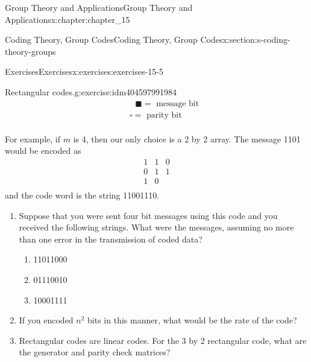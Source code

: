 \documentclass[twoside,10pt,]{book}
\numberwithin{equation}{section}
\begin{document}
\begin{chapterptx}{Group Theory and Applications}{}{Group Theory and Applications}{}{}{x:chapter:chapter_15}
\begin{sectionptx}{Coding Theory, Group Codes}{}{Coding Theory, Group Codes}{}{}{x:section:s-coding-theory-groups}
\begin{exercises-subsection}{Exercises}{}{Exercises}{}{}{x:exercises:exercises-15-5}
\begin{divisionexercise}{6}{Rectangular codes.}{}{g:exercise:idm404597991984}
\begin{equation*}
\begin{array}{cccccc}
\end{array}  \quad \begin{array}{c}
\textrm{      }\blacksquare  = \textrm{ message} \textrm{ bit} \\
\square  =\textrm{ parity} \textrm{ bit} \\
\end{array}
\end{equation*}
%
\par
For example, if \(m\) is 4, then our only choice is a 2 by 2 array.  The message 1101 would be encoded as%
\begin{equation*}
\begin{array}{cc|c}
1 & 1 & 0\\
0 & 1 & 1\\
\hline
1 & 0 &\\
\end{array}
\end{equation*}
and the code word is the string 11001110.%
\par
%
\begin{enumerate}[label=(\alph*)]
\item{}Suppose that you were sent four bit messages using this code and you received the following strings.  What were the messages, assuming no more than one error in the transmission of coded data?%
\begin{multicols}{3}
\begin{enumerate}[label=(\roman*)]
\item{}11011000%
\item{}01110010%
\item{}10001111%
\end{enumerate}
\end{multicols}
%
\item{}If you encoded \(n^2\) bits in this manner, what would be the rate of the code?%
\item{}Rectangular codes are linear codes.  For the 3 by 2 rectangular code, what are the generator and parity check matrices?%
\end{enumerate}
%
\end{divisionexercise}%
\end{exercises-subsection}
\end{sectionptx}
\end{chapterptx}
%
%
\typeout{************************************************}
\typeout{************************************************}
%
\end{document}
